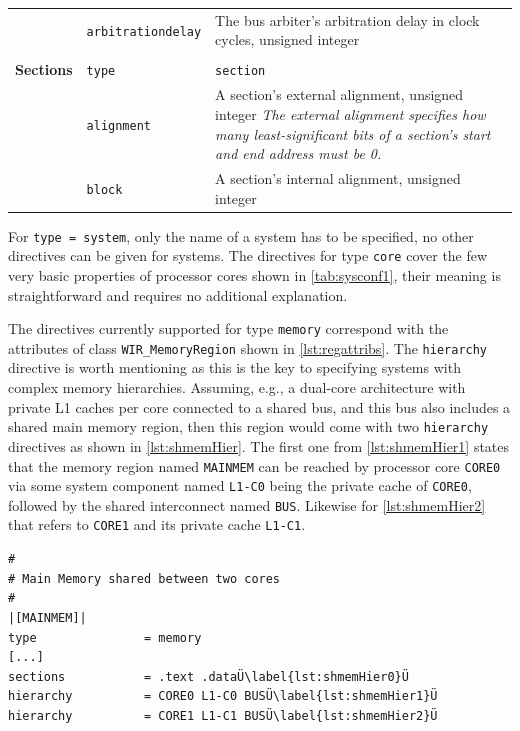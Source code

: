 \begin{table}[t]
\begin{center}
\begin{tabular}{|p{15mm}|p{33mm}|p{11.3cm}|}
      \hhline{|~|-|-|}
      & \small\texttt{arbitrationdelay} & The bus arbiter's arbitration delay in clock cycles, unsigned integer \\
      \hhline{|=|=|=|}
      \multirow{3}{*}{\shortstack[l]{\textbf{Logical} \\ \textbf{Sections}}} & \small\texttt{type} & \small\texttt{section} \\
      \hhline{|~|-|-|}
      & \small\texttt{alignment} & A section's external alignment, unsigned integer \newline \textit{The external alignment specifies how many least-significant bits of a section's start and end address must be 0.} \\
      \hhline{|~|-|-|}
      & \small\texttt{block} & A section's internal alignment, unsigned integer \\
      \hline
    \end{tabular}
  \end{center}
\end{table}

\clearpage

For \texttt{type = system}, only the name of a system has to be specified, no other directives can be given for systems.
The directives for type \texttt{core} cover the few very basic properties of processor cores shown in \cref{tab:sysconf1}, their meaning is straightforward and requires no additional explanation.

The directives currently supported for type \texttt{memory} correspond with the attributes of class \texttt{WIR\_MemoryRegion} shown in \cref{lst:regattribs}.
The \texttt{hierarchy} directive is worth mentioning as this is the key to specifying systems with complex memory hierarchies.
Assuming, e.g., a dual-core architecture with private L1 caches per core connected to a shared bus, and this bus also includes a shared main memory region, then this region would come with two \texttt{hierarchy} directives as shown in \cref{lst:shmemHier}.
The first one from \cref{lst:shmemHier1} states that the memory region named \texttt{MAINMEM} can be reached by processor core \texttt{CORE0} via some system component named \texttt{L1-C0} being the private cache of \texttt{CORE0}, followed by the shared interconnect named \texttt{BUS}.
Likewise for \cref{lst:shmemHier2} that refers to \texttt{CORE1} and its private cache \texttt{L1-C1}.

\begin{lstlisting}[style=commandline,float=t!,caption={Example for Shared Memory Hierarchy Configuration},label=lst:shmemHier]
#
# Main Memory shared between two cores
#
|[MAINMEM]|
type               = memory
[...]
sections           = .text .dataÜ\label{lst:shmemHier0}Ü
hierarchy          = CORE0 L1-C0 BUSÜ\label{lst:shmemHier1}Ü
hierarchy          = CORE1 L1-C1 BUSÜ\label{lst:shmemHier2}Ü
\end{lstlisting}

